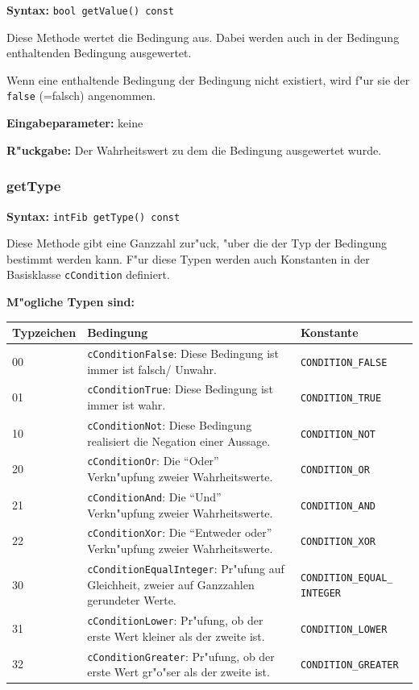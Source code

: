 \textbf{Syntax:} \verb|bool getValue() const|

\bigskip\noindent
Diese Methode wertet die Bedingung aus. Dabei werden auch in der Bedingung enthaltenden Bedingung ausgewertet.

Wenn eine enthaltende Bedingung der Bedingung nicht existiert, wird f"ur sie der \verb|false| (=falsch) angenommen.

\bigskip\noindent
\textbf{Eingabeparameter:} keine

\bigskip\noindent
\textbf{R"uckgabe:} Der Wahrheitswert zu dem die Bedingung ausgewertet wurde.


\subsubsection{getType}

\textbf{Syntax:} \verb|intFib getType() const|

\bigskip\noindent
Diese Methode gibt eine Ganzzahl zur"uck, "uber die der Typ der Bedingung bestimmt werden kann. F"ur diese Typen werden auch Konstanten in der Basisklasse \verb|cCondition| definiert.

\bigskip\noindent
\textbf{M"ogliche Typen sind:}

\noindent
\begin{tabular}{|p{10mm}|p{60mm}|p{40mm}|}\hline
	Typ\-zei\-chen & Bedingung & Konstante \\\hline\hline
	00 & \verb|cConditionFalse|: Diese Bedingung ist immer ist falsch/ Unwahr. & \verb|CONDITION_FALSE| \\\hline
	01 & \verb|cConditionTrue|: Diese Bedingung ist immer ist wahr. & \verb|CONDITION_TRUE| \\\hline
	10 & \verb|cConditionNot|: Diese Bedingung realisiert die Negation einer Aussage. & \verb|CONDITION_NOT| \\\hline
	20 & \verb|cConditionOr|: Die ``Oder'' Verkn"upfung zweier Wahrheitswerte. & \verb|CONDITION_OR| \\\hline
	21 & \verb|cConditionAnd|: Die ``Und'' Verkn"upfung zweier Wahrheitswerte. & \verb|CONDITION_AND| \\\hline
	22 & \verb|cConditionXor|: Die ``Entweder oder'' Verkn"upfung zweier Wahrheitswerte. & \verb|CONDITION_XOR| \\\hline
	30 & \verb|cConditionEqualInteger|: Pr"ufung auf Gleichheit, zweier auf Ganzzahlen gerundeter Werte. & \verb|CONDITION_EQUAL_| \verb|INTEGER| \\\hline
	31 & \verb|cConditionLower|: Pr"ufung, ob der erste Wert kleiner als der zweite ist. & \verb|CONDITION_LOWER| \\\hline
	32 & \verb|cConditionGreater|: Pr"ufung, ob der erste Wert gr"o"ser als der zweite ist. & \verb|CONDITION_GREATER| \\\hline
\end{tabular}

